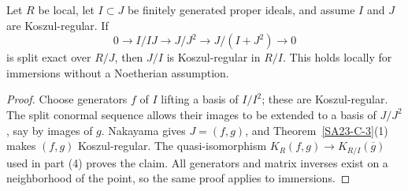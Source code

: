 \begin{proposition}\label{SA23-C-4}
Let $R$ be local, let $I\subset J$ be finitely generated proper ideals,
and assume $I$ and $J$ are Koszul-regular.  If
\[
 0\longrightarrow I/IJ\longrightarrow J/J^2
 \longrightarrow J/(I+J^2)\longrightarrow0
\]
is split exact over $R/J$, then $J/I$ is Koszul-regular in $R/I$.
This holds locally for immersions without a Noetherian assumption.
\end{proposition}
\begin{proof}
Choose generators $f$ of $I$ lifting a basis of $I/I^2$; these are
Koszul-regular.  The split conormal sequence allows their images to be
extended to a basis of $J/J^2$, say by images of $g$.  Nakayama gives
$J=(f,g)$, and Theorem~\ref{SA23-C-3}(1) makes $(f,g)$
Koszul-regular.  The quasi-isomorphism
$K_R(f,g)\to K_{R/I}(\overline g)$ used in part (4) proves the
claim.  All generators and matrix inverses exist on a neighborhood of
the point, so the same proof applies to immersions.
\end{proof}

